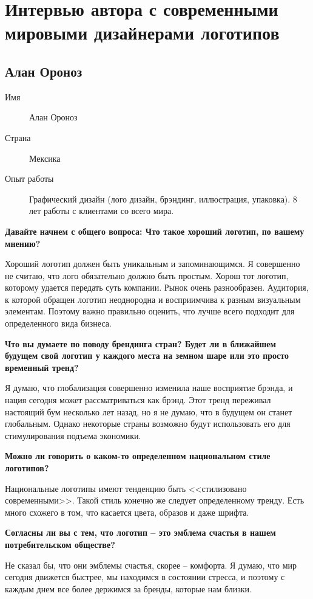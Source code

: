 \section{Интервью автора с современными мировыми дизайнерами логотипов}

\subsection{Алан Ороноз}

\begin{description}
\item[Имя] Алан Ороноз
\item[Страна] Мексика
\item[Опыт работы] Графический дизайн (лого дизайн, брэндинг, иллюстрация, упаковка). 8 лет работы с клиентами со всего мира.
\end{description}

\textbf{Давайте начнем с общего вопроса: Что такое хороший логотип, по вашему мнению?}

Хороший логотип должен быть уникальным и запоминающимся. Я совершенно не считаю, что лого обязательно должно быть простым. Хорош тот логотип, которому удается передать суть компании. Рынок очень разнообразен. Аудитория, к которой обращен логотип неоднородна и восприимчива к разным визуальным элементам. Поэтому важно правильно оценить, что лучше всего подходит для определенного вида бизнеса.

\textbf{Что вы думаете по поводу брендинга стран? Будет ли в ближайшем будущем свой логотип у каждого места на земном шаре или это просто временный тренд?}

Я думаю, что глобализация совершенно изменила наше восприятие брэнда, и нация сегодня может рассматриваться как брэнд. Этот тренд переживал настоящий бум несколько лет назад, но я не думаю, что в будущем он станет глобальным. Однако некоторые страны возможно будут использовать его для стимулирования подъема экономики.


\textbf{Можно ли говорить о каком-то определенном национальном стиле логотипов?}

Национальные логотипы имеют тенденцию быть <<стилизовано современными>>. Такой стиль конечно же следует определенному тренду. Есть много схожего в том, что касается цвета, образов и даже шрифта.

\textbf{Согласны ли вы с тем, что логотип – это эмблема счастья в нашем потребительском обществе?}

Не сказал бы, что они эмблемы счастья, скорее – комфорта. Я думаю, что мир сегодня движется быстрее, мы находимся в состоянии стресса, и поэтому с каждым днем все более держимся за бренды, которые нам близки.

